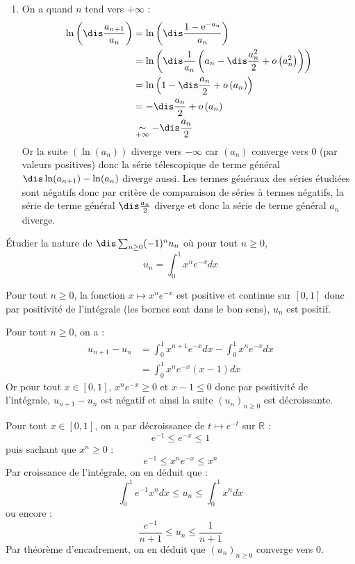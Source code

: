 \documentclass[a4paper,10pt]{report}
\begin{document}
\begin{enumerate}
\item  On a quand $n$ tend vers $+ \infty$ :
\begin{align*}
\ln \left( {\dis\frac{{a_{n + 1} }}{{a_n }}} \right) & =  \ln \left( {\dis\frac{1 - {\mathrm{e}}^{ - a_n }}{{a_n }}} \right) \\
&  =  \ln \left( \dis\frac{1}{a_n}\left(a_n-\dis\frac{a_n^2}{2}+ o\left(a_n^2\right)\right) \right)\\
& =  	\ln \left(1-\dis\frac{a_n}{2}+ o\left(a_n\right) \right) \\
& = -\dis\frac{a_n}{2}+ o\left(a_n\right) \\
& \underset{+ \infty}{\sim} -\dis\frac{a_n}{2} \\
\end{align*}
Or la suite $(\ln(a_n))$ diverge vers $-\infty$ car $(a_n)$ converge vers $0$ (par valeurs positives) donc la s\'erie t\'elescopique de terme général $\dis \ln(a_{n+1})-\ln(a_n)$ diverge aussi. Les termes g\'en\'eraux des s\'eries étudiées sont n\'egatifs donc par critère de comparaison de séries à termes négatifs, la série de terme général $ \dis\frac{a_n}{2}$ diverge et donc la s\'erie de terme général $a_n$ diverge.
\end{enumerate}

\begin{Exa} Étudier la nature de $\dis \sum_{n \geq 0} (-1)^n u_n$ où pour tout $n \geq 0$,
$$ u_n = \int_{0}^1 x^n e^{-x} dx$$
\end{Exa}

\corr Pour tout $n \geq 0$, la fonction $x \mapsto x^n e^{-x}$ est positive et continue sur $[0,1]$ donc par positivité de l'intégrale (les bornes sont dans le bon sens), $u_n$ est positif.

\medskip

\noindent Pour tout $n \geq 0$, on a :
\begin{align*}
u_{n+1}-u_n & = \int_{0}^1 x^{n+1} e^{-x} dx - \int_{0}^1 x^{n} e^{-x} dx \\
& =\int_{0}^1 x^n e^{-x} (x-1) dx
\end{align*}
Or pour tout $x \in [0,1]$, $x^n e^{-x} \geq 0$ et $x-1 \leq 0$ donc par positivité de l'intégrale, $u_{n+1}-u_n$ est négatif et ainsi la suite $(u_n)_{n \geq 0}$ est décroissante.

\medskip

\noindent Pour tout $x \in [0,1]$, on a par décroissance de $t \mapsto e^{-t}$ sur $\mathbb{R}$ :
$$e^{-1} \leq e^{-x} \leq 1$$
puis sachant que $x^n \geq 0$ :
$$ e^{-1} \leq x^n e^{-x} \leq x^n $$
Par croissance de l'intégrale, on en déduit que :
$$ \int_{0}^1 e^{-1}x^n dx \leq u_n \leq \int_{0}^1 x^n dx$$
ou encore :
$$ \frac{e^{-1}}{n+1} \leq u_n \leq \frac{1}{n+1}$$
Par théorème d'encadrement, on en déduit que $(u_n)_{n \geq 0}$ converge vers $0$.
\end{document}
